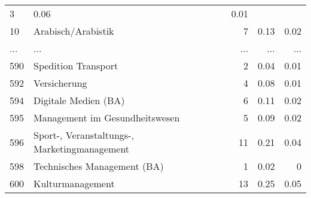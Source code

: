\begin{longtable}{lXrrr}
          \num{3} &
          \num[round-mode=places,round-precision=2]{0.06} &
          \num[round-mode=places,round-precision=2]{0.01} \\
        10 & \multicolumn{1}{X}{Arabisch/Arabistik} & %
          \num{7} &
          \num[round-mode=places,round-precision=2]{0.13} &
          \num[round-mode=places,round-precision=2]{0.02} \\
       ... & ... & ... & ... & ... \\
        590 & \multicolumn{1}{X}{Spedition Transport} & %
          \num{2} &
          \num[round-mode=places,round-precision=2]{0.04} &
          \num[round-mode=places,round-precision=2]{0.01} \\

        592 & \multicolumn{1}{X}{Versicherung} & %
          \num{4} &
          \num[round-mode=places,round-precision=2]{0.08} &
          \num[round-mode=places,round-precision=2]{0.01} \\

        594 & \multicolumn{1}{X}{Digitale Medien (BA)} & %
          \num{6} &
          \num[round-mode=places,round-precision=2]{0.11} &
          \num[round-mode=places,round-precision=2]{0.02} \\

        595 & \multicolumn{1}{X}{Management im Gesundheitswesen} & %
          \num{5} &
          \num[round-mode=places,round-precision=2]{0.09} &
          \num[round-mode=places,round-precision=2]{0.02} \\

        596 & \multicolumn{1}{X}{Sport-, Veranstaltungs-, Marketingmanagement} & %
          \num{11} &
          \num[round-mode=places,round-precision=2]{0.21} &
          \num[round-mode=places,round-precision=2]{0.04} \\

        598 & \multicolumn{1}{X}{Technisches Management (BA)} & %
          \num{1} &
          \num[round-mode=places,round-precision=2]{0.02} &
          \num[round-mode=places,round-precision=2]{0} \\

        600 & \multicolumn{1}{X}{Kulturmanagement} & %
          \num{13} &
          \num[round-mode=places,round-precision=2]{0.25} &
          \num[round-mode=places,round-precision=2]{0.05} \\


\end{longtable}
